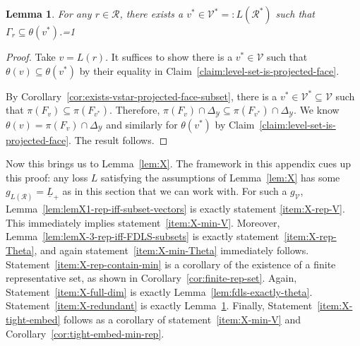 \documentclass[11pt]{article}
\newcommand{\Comments}{1}
\newcommand{\mytodo}[2]{\ifnum\Comments=1%
  \todo[linecolor=#1!80!black,backgroundcolor=#1,bordercolor=#1!80!black]{#2}\fi}
\newcommand{\btw}[1]{\mytodo{gray!20!white}{BTW: #1}}%
\newcommand{\simplex}{\Delta_\Y}
\newcommand{\R}{\mathcal{R}}
\newcommand{\V}{\mathcal{V}}
\newcommand{\Y}{\mathcal{Y}}
\newcommand{\risk}[1]{\underline{#1}}
\newtheorem{lemma}{Lemma}
\begin{document}
\begin{lemma}\label{lem:any-levelset-contained-in-minlevelset}
  For any $r \in \R$, there exists a $v^* \in \V^* =: L(\R^*)$ such that $\Gamma_r \subseteq \theta(v^*)$.\btw{(7)}
\end{lemma}
\begin{proof}
  Take $v = L(r)$.
  It suffices to show there is a $v^* \in \V$ such that $\theta(v) \subseteq \theta(v^*)$ by their equality in Claim~\ref{claim:level-set-is-projected-face}.

  By Corollary~\ref{cor:exists-vstar-projected-face-subset}, there is a $v^* \in \V^* \subseteq \V$ such that $\pi(F_v) \subseteq \pi(F_{v^*})$.
  Therefore, $\pi(F_v) \cap \simplex \subseteq \pi(F_{v^*})\cap \simplex$.  
  We know $\theta(v) = \pi(F_v) \cap \simplex$ and similarly for $\theta(v^*)$ by Claim~\ref{claim:level-set-is-projected-face}.
  The result follows.
\end{proof}

Now this brings us to Lemma~\ref{lem:X}.
The framework in this appendix cues up this proof: any loss $L$ satisfying the assumptions of Lemma~\ref{lem:X} has some $g_{L(\R)} = \risk{L}_+$ as in this section that we can work with. 
For such a $g_\V$, Lemma~\ref{lem:lemX1-rep-iff-subset-vectors} is exactly statement \eqref{item:X-rep-V}.
This immediately implies statement~\eqref{item:X-min-V}.
Moreover, Lemma~\ref{lem:lemX-3-rep-iff-FDLS-subsets} is exactly statement~\eqref{item:X-rep-Theta}, and again statement~\eqref{item:X-min-Theta} immediately follows.
Statement~\eqref{item:X-rep-contain-min} is a corollary of the existence of a finite representative set, as shown in Corollary~\ref{cor:finite-rep-set}.
Again, Statement~\eqref{item:X-full-dim} is exactly Lemma~\ref{lem:fdls-exactly-theta}.
Statement~\eqref{item:X-redundant} is exactly Lemma~\ref{lem:any-levelset-contained-in-minlevelset}.
Finally, Statement~\eqref{item:X-tight-embed} follows as a corollary of statement~\eqref{item:X-min-V} and Corollary~\ref{cor:tight-embed-min-rep}.
\end{document}
